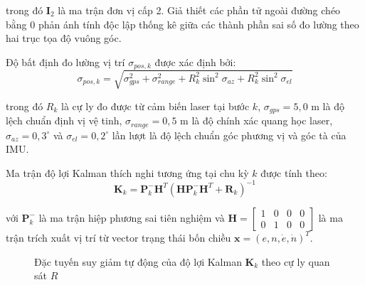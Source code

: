 trong đó $\mathbf{I}_2$ là ma trận đơn vị cấp 2. Giả thiết các phần tử ngoài đường chéo bằng 0 phản ánh tính độc lập thống kê giữa các thành phần sai số đo lường theo hai trục tọa độ vuông góc.

Độ bất định đo lường vị trí $\sigma_{pos,k}$ được xác định bởi:
\begin{equation}
\sigma_{pos,k} = \sqrt{\sigma_{gps}^2 + \sigma_{range}^2 + R_k^2 \sin^2\sigma_{az} + R_k^2 \sin^2\sigma_{el}}
\label{eq:sigma-pos-k}
\end{equation}

trong đó $R_k$ là cự ly đo được từ cảm biến laser tại bước $k$, $\sigma_{gps} = 5{,}0$ m là độ lệch chuẩn định vị vệ tinh, $\sigma_{range} = 0{,}5$ m là độ chính xác quang học laser, $\sigma_{az} = 0{,}3^\circ$ và $\sigma_{el} = 0{,}2^\circ$ lần lượt là độ lệch chuẩn góc phương vị và góc tà của IMU.

Ma trận độ lợi Kalman thích nghi tương ứng tại chu kỳ $k$ được tính theo:
\begin{equation}
\mathbf{K}_k = \mathbf{P}_k^- \mathbf{H}^T \left( \mathbf{H} \mathbf{P}_k^- \mathbf{H}^T + \mathbf{R}_k \right)^{-1}
\label{eq:adaptive-kalman-gain}
\end{equation}

với $\mathbf{P}_k^-$ là ma trận hiệp phương sai tiên nghiệm và $\mathbf{H} = \begin{bmatrix} 1 & 0 & 0 & 0 \\ 0 & 1 & 0 & 0 \end{bmatrix}$ là ma trận trích xuất vị trí từ vector trạng thái bốn chiều $\mathbf{x} = (e, n, \dot{e}, \dot{n})^T$.

\begin{figure}[H]
\centering
{}
\caption{Đặc tuyến suy giảm tự động của độ lợi Kalman $\mathbf{K}_k$ theo cự ly quan sát $R$}
\label{fig:adaptive-gain-curve}
\end{figure}

